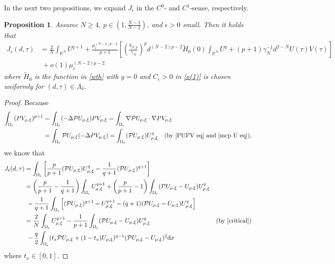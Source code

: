 \documentclass[reqno]{amsart}
\newtheorem{proposition}[theorem]{Proposition}
\theoremstyle{remark}
\newcommand{\ep}{\epsilon}
\newcommand{\ga}{\gamma}
\newcommand{\R}{\mathbb{R}}
\newcommand{\mcp}{\mathcal{P}}
\newcommand{\wth}{\widetilde{H}}
\newcommand{\dx}{\textup{d}x}
\newcommand{\mx}{{\mu,\xi}}
\renewcommand{\(}{\left(}
\renewcommand{\)}{\right)}
\numberwithin{equation}{section}
\begin{document}
In the next two propositions, we expand $J_\ep$ in the $C^0$- and $C^1$-sense, respectively.
\begin{proposition}\label{C0 est}
Assume $N \ge 4$, $p \in (1,\frac{N-1}{N-2})$, and $\ep > 0$ small. Then it holds that
\begin{align}
J_\ep(d,\tau) &= \frac{2}{N}\int_{\R^N}U^{q+1} + \frac{\mu_\ep^{(N-2)p-2}}{p+1} \left[\(\frac{b_{N,p}}{\ga_N}\)^p d^{(N-2)p-2} \wth_0(0)\int_{\R^N}U^q + (p+1)\ga_N^{-1} d^{2-N}U(\tau)V(\tau)\right] \nonumber \\
&\ +o(1)\mu_\ep^{(N-2)p-2} \label{ene exp}
\end{align}
where $\wth_0$ is the function in \eqref{wth} with $y = 0$ and $C_\ep > 0$ in \eqref{o(1)} is chosen uniformly for $(d,\tau)\in \Lambda_\delta$.
\end{proposition}
\begin{proof}
Because
\begin{align*}
\int_{\Omega_\ep}(PV_\mx) ^{p+1} &= \int_{\Omega_\ep} (-\Delta \mcp U_\mx) PV_\mx = \int_{\Omega_\ep}\nabla \mcp U_\mx\cdot \nabla PV_\mx \\
&= \int_{\Omega_\ep} \mcp U_\mx(-\Delta PV_\mx) = \int_{\Omega_\ep}(\mcp U_\mx)U_\mx^q \quad \textup{(by \eqref{PUPV eq} and \eqref{mcp U eq})},
\end{align*}
we know that
\begin{equation}\label{ene exp pre}
\begin{aligned}
J_\ep(d,\tau) &= \int_{\Omega_\ep} \left[\frac{p}{p+1}(\mcp U_\mx)U_\mx^q-\frac{1}{q+1}(\mcp U_\mx)^{q+1}\right] \\
&= \(\frac{p}{p+1}-\frac{1}{q+1}\)\int_{\Omega_\ep}U_\mx^{q+1} + \(\frac{p}{p+1}-1\)
\int_{\Omega_\ep}(\mcp U_\mx-U_\mx)U_\mx^q \\
&\ -\frac{1}{q+1}\int_{\Omega_\ep} \left[(\mcp U_\mx)^{q+1}-U_\mx^{q+1}-(q+1)(\mcp U_\mx-U_\mx)U_\mx^q\right] \\
&= \frac{2}{N}\int_{\Omega_\ep}U_\mx^{q+1} -\frac{1}{p+1}\int_{\Omega_\ep}(\mcp U_\mx-U_\mx)U_\mx^q &(\textup{by \eqref{critical}}) \\
&\ -\frac{q}{2}\int_{\Omega_\ep} (t_x\mcp U_\mx+(1-t_x)U_\mx)^{q-1}(\mcp U_\mx-U_\mx)^2 \dx
\end{aligned}
\end{equation}
where $t_x \in [0,1]$.


\end{proof}
\end{document}
